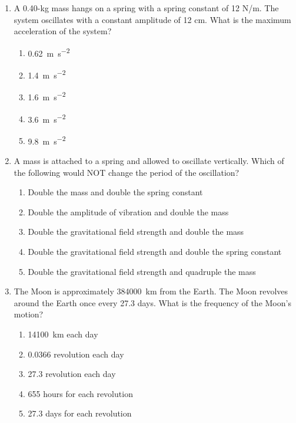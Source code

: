 \documentclass{../../../oss-apphys}
\begin{document}
\genheader


\genmultidirections

\gengravity

\raggedcolumns
\begin{multicols}{2}
  \begin{enumerate}[leftmargin=18pt]

  \item A 0.40-kg mass hangs on a spring with a spring constant of 12 N/m.
    The system oscillates with a constant amplitude of 12 cm. What is the
    maximum acceleration of the system?
    \begin{enumerate}[noitemsep,topsep=0pt,leftmargin=18pt,label=(\Alph*)]
    \item\SI{.62}{\metre\per\second\squared}
    \item\SI{1.4}{\metre\per\second\squared}
    \item\SI{1.6}{\metre\per\second\squared}
    \item\SI{3.6}{\metre\per\second\squared}
    \item\SI{9.8}{\metre\per\second\squared}
    \end{enumerate}

  \item A mass is attached to a spring and allowed to oscillate vertically.
    Which of the following would NOT change the period of the oscillation?
    \begin{enumerate}[nosep,leftmargin=18pt,label=(\Alph*)]
    \item Double the mass and double the spring constant
    \item Double the amplitude of vibration and double the mass
    \item Double the gravitational field strength and double the mass
    \item Double the gravitational field strength and double the spring constant
    \item Double the gravitational field strength and quadruple the mass
    \end{enumerate}
    \vspace{.7in}
    
  \item The Moon is approximately \SI{384000}{\kilo\metre} from the Earth. The
    Moon revolves around the Earth once every 27.3 days. What is the frequency
    of the Moon's motion?
    \begin{enumerate}[nosep,leftmargin=18pt,label=(\Alph*)]
    \item \SI{14100}{\kilo\metre} each day
    \item 0.0366 revolution each day
    \item 27.3 revolution each day
    \item 655 hours for each revolution
    \item 27.3 days for each revolution
    \end{enumerate}
    \columnbreak
    

\end{enumerate}
\end{multicols}
\end{document}
